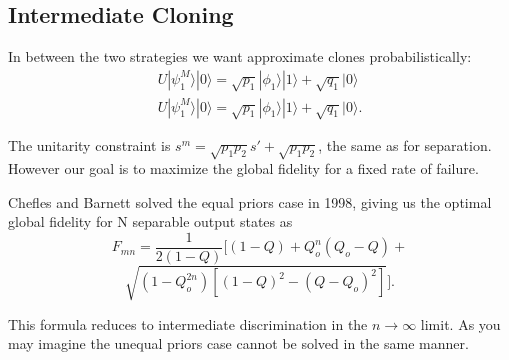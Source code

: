 \documentclass{beamer}
\newcommand{\ke}[1]{|#1\rangle}
\begin{document}
\subsection{Intermediate Cloning}
\begin{frame}
In between the two strategies we want approximate clones probabilistically:
\begin{eqnarray}
U \ke{\psi_1^M} \ke 0 = \sqrt{p_1} \ke {\phi_1} \ke 1 + \sqrt{q_1} \ke 0\\
U \ke{\psi_1^M} \ke 0 = \sqrt{p_1} \ke {\phi_1} \ke 1 + \sqrt{q_1} \ke 0 .
\end{eqnarray}

The unitarity constraint is $s^m = \sqrt{p_1 p_2} s' + \sqrt{p_1 p_2}$, the same as for separation.  However
our goal is to maximize the global fidelity for a fixed rate of failure.
\end{frame}
\begin{frame}
Chefles and Barnett solved the equal priors case in 1998, giving us the optimal global fidelity for N separable output states as 
\[F_{mn}  =\frac{1}{2\left(1-Q\right)}[(1-Q)+Q_{o}^{n}(Q_{o}-Q)+\]
\[\sqrt{(1-Q_{o}^{2n})\left[(1-Q)^{2}-(Q-Q_{o})^{2}\right]}].\]

This formula reduces to intermediate discrimination in the $n \rightarrow \infty$ limit.
As you may imagine the unequal priors case cannot be solved in the same manner.  
\end{frame}
\end{document}
